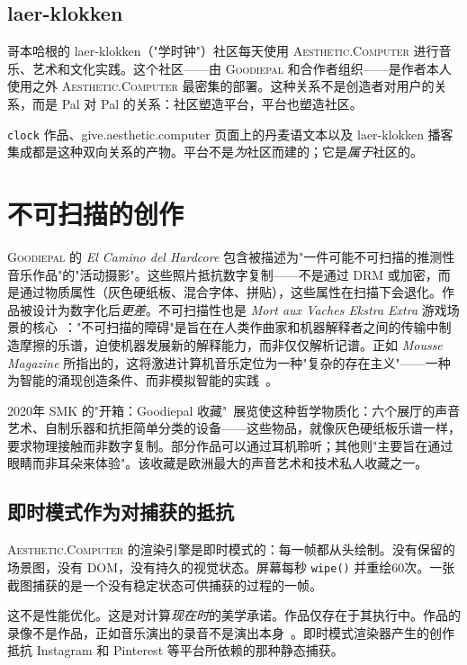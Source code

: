 \documentclass[10pt,letterpaper,twocolumn]{article}
\newcommand{\ac}{\textsc{Aesthetic.Computer}}
\newcommand{\gp}{\textsc{Goodiepal}}
\begin{document}
\subsection{laer-klokken}

哥本哈根的 laer-klokken（"学时钟"）社区每天使用 \ac{} 进行音乐、艺术和文化实践。这个社区——由 \gp{} 和合作者组织——是作者本人使用之外 \ac{} 最密集的部署。这种关系不是创造者对用户的关系，而是 Pal 对 Pal 的关系：社区塑造平台，平台也塑造社区。

\texttt{clock} 作品、give.aesthetic.computer 页面上的丹麦语文本以及 laer-klokken 播客集成都是这种双向关系的产物。平台不是\emph{为}社区而建的；它是\emph{属于}社区的。

\section{不可扫描的创作}

\gp{} 的 \emph{El Camino del Hardcore} 包含被描述为"一件可能不可扫描的推测性音乐作品"的"活动摄影"。这些照片抵抗数字复制——不是通过 DRM 或加密，而是通过物质属性（灰色硬纸板、混合字体、拼贴），这些属性在扫描下会退化。作品被设计为数字化后\emph{更差}。不可扫描性也是 \emph{Mort aux Vaches Ekstra Extra} 游戏场景的核心~\citep{goodiepal2007mortauxvaches}："不可扫描的障碍"是旨在在人类作曲家和机器解释者之间的传输中制造摩擦的乐谱，迫使机器发展新的解释能力，而非仅仅解析记谱。正如 \emph{Mousse Magazine} 所指出的，这将激进计算机音乐定位为一种"复杂的存在主义"——一种为智能的涌现创造条件、而非模拟智能的实践~\citep{mousse2018goodiepal}。

2020年 SMK 的"开箱：Goodiepal 收藏"~\citep{smk2020unboxing}展览使这种哲学物质化：六个展厅的声音艺术、自制乐器和抗拒简单分类的设备——这些物品，就像灰色硬纸板乐谱一样，要求物理接触而非数字复制。部分作品可以通过耳机聆听；其他则"主要旨在通过眼睛而非耳朵来体验"。该收藏是欧洲最大的声音艺术和技术私人收藏之一。

\subsection{即时模式作为对捕获的抵抗}

\ac{} 的渲染引擎是即时模式的：每一帧都从头绘制。没有保留的场景图，没有 DOM，没有持久的视觉状态。屏幕每秒 \texttt{wipe()} 并重绘60次。一张截图捕获的是一个没有稳定状态可供捕获的过程的一帧。

这不是性能优化。这是对计算\emph{现在时}的美学承诺。作品仅存在于其执行中。作品的录像不是作品，正如音乐演出的录音不是演出本身~\citep{magnusson2010designing}。即时模式渲染器产生的创作抵抗 Instagram 和 Pinterest 等平台所依赖的那种静态捕获。
\end{document}
